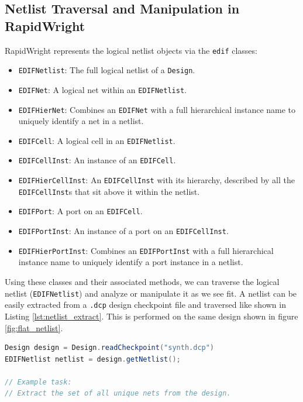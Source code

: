 \begin{multicols}{2}

\subsection{Netlist Traversal and Manipulation in RapidWright}

RapidWright represents the logical netlist objects via the \texttt{edif} classes:
\begin{itemize}
    \item \texttt{EDIFNetlist}: The full logical netlist of a \texttt{Design}. 
    \item \texttt{EDIFNet}: A logical net within an \texttt{EDIFNetlist}.
    \item \texttt{EDIFHierNet}: Combines an \texttt{EDIFNet} with a full hierarchical instance name to uniquely identify a net in a netlist.
    \item \texttt{EDIFCell}: A logical cell in an \texttt{EDIFNetlist}. 
    \item \texttt{EDIFCellInst}: An instance of an \texttt{EDIFCell}. 
    \item \texttt{EDIFHierCellInst}: An \texttt{EDIFCellInst} with its hierarchy, described by all the \texttt{EDIFCellInst}s that sit above it within the netlist.
    \item \texttt{EDIFPort}: A port on an \texttt{EDIFCell}. 
    \item \texttt{EDIFPortInst}: An instance of a port on an \texttt{EDIFCellInst}. 
    \item \texttt{EDIFHierPortInst}: Combines an \texttt{EDIFPortInst} with a full hierarchical instance name to uniquely identify a port instance in a netlist. 
\end{itemize}


Using these classes and their associated methods, we can traverse the logical netlist (\texttt{EDIFNetlist}) and analyze or manipulate it as we see fit. 
A netlist can be easily extracted from a \texttt{.dcp} design checkpoint file and traversed like shown in Listing \ref{lst:netlist_extract}. 
This is performed on the same design shown in figure \ref{fig:flat_netlist}.

\begin{lstlisting}[language=java, caption={Netlist extraction and traversal}, label={lst:netlist_extract}]
Design design = Design.readCheckpoint("synth.dcp")
EDIFNetlist netlist = design.getNetlist();

// Example task:
// Extract the set of all unique nets from the design.


\end{lstlisting}
\end{multicols}
